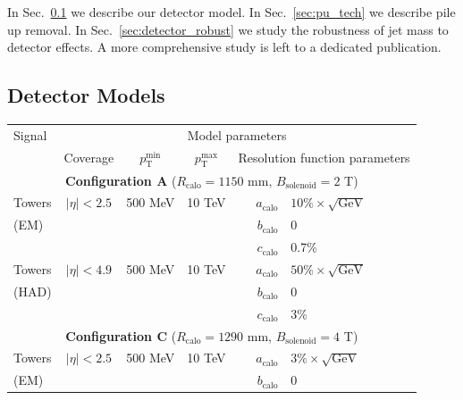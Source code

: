 \documentclass[11pt,letterpaper]{article}
\newcommand{\GeV}{\text{GeV}}
\DeclareRobustCommand{\Sec}[1]{Sec.~\ref{#1}}
\newcommand{\ptmin}{\ensuremath{p_{\text{T}}^{\text{min}}}}
\newcommand{\ptmax}{\ensuremath{p_{\text{T}}^{\text{max}}}}
\newcommand{\acalo}{\ensuremath{a_{\text{calo}}}}
\newcommand{\bcalo}{\ensuremath{b_{\text{calo}}}}
\newcommand{\ccalo}{\ensuremath{c_{\text{calo}}}}
\begin{document}
In \Sec{sec:det_model} we describe our detector model. In \Sec{sec:pu_tech} we describe pile up removal. In \Sec{sec:detector_robust} we study the robustness of jet mass to detector effects. A more comprehensive study is left to a dedicated publication.

\subsection{Detector Models}\label{sec:det_model}





\begin{table}\centering
\renewcommand{\arraystretch}{1.25}
\begin{tabular}{|l|c|c|c|r@{\ =\ }l|}
\hline
Signal  & \multicolumn{5}{c|}{Model parameters}    \\ \cline{2-6}                      
        & Coverage
        & \ptmin
        & \ptmax 
        & \multicolumn{2}{c|}{Resolution function parameters} \\
\hline
\multicolumn{6}{|c|}{\textbf{Configuration A} ($R_{\text{calo}} = 1150$ mm, $B_{\text{solenoid}} = 2$ T)} \\
\hline
Towers     & $|\eta| < 2.5$ & 500 MeV &  10 TeV   & \acalo & $10\%\times\sqrt{\GeV}$                  \\ 
(EM)       &                &         &           & \bcalo & 0                                        \\
           &                &         &           & \ccalo & 0.7\%                                    \\
Towers     & $|\eta| < 4.9$ & 500 MeV &  10 TeV   & \acalo & $50\%\times\sqrt{\GeV}$                  \\
(HAD)      &                &         &           & \bcalo & 0                                        \\
           &                &         &           & \ccalo & 3\%                                      \\
\hline 
\multicolumn{6}{|c|}{\textbf{Configuration C} ($R_{\text{calo}} = 1290$ mm, $B_{\text{solenoid}} = 4$ T)} \\
\hline
Towers     & $|\eta| < 2.5$ & 500 MeV &  10 TeV   & \acalo & $3\%\times\sqrt{\GeV}$                   \\
(EM)       &                &         &           & \bcalo & 0                                        \\

\end{tabular}
\end{table}
\end{document}

